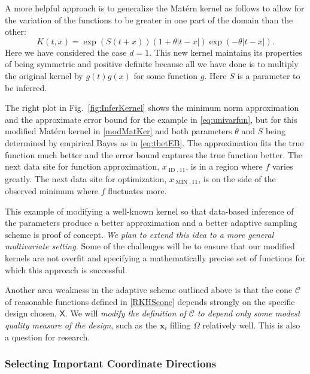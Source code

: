 \documentclass[11pt]{NSFamsart}
\DeclareMathOperator{\MIN}{MIN}
\DeclareMathOperator{\ID}{ID}
\newcommand{\mX}{\mathsf{X}}
\newcommand{\bx}{{\boldsymbol{x}}}
\newcommand{\calc}{{\mathcal{C}}}
\def\abs#1{\ensuremath{\left \lvert #1 \right \rvert}}
\begin{document}
A more helpful approach is to generalize the Mat\'ern kernel as follows to allow for the variation of the functions to be greater in one part of the domain than the other:
\begin{equation} \label{modMatKer}
    K(t,x) = \exp(S(t+x))(1 + \theta \abs{t-x}) \exp(-\theta\abs{t-x}).
\end{equation}
Here we have considered the case $d=1$.  This new kernel maintains its properties of being symmetric and positive definite because all we have done is to multiply the original kernel by $g(t)g(x)$ for some function $g$.  Here $S$ is a parameter to be inferred.

The right plot in Fig.\ \ref{fig:InferKernel} shows the minimum norm approximation and the approximate error bound for the example in \eqref{eq:univarfun}, but for this modified Mat\'ern kernel in \eqref{modMatKer} and both parameters $\theta$ and $S$ being determined by empirical Bayes as in \eqref{eq:thetEB}.  The approximation fits the true function much better and the error bound captures the true function better.  The next data site for function approximation, $x_{\ID,11}$, is in a region where $f$ varies greatly.  The next data site for optimization, $x_{\MIN,11}$,  is on the side of the observed minimum where $f$ fluctuates more.

This example of modifying a well-known kernel so that data-based inference of the parameters produce a better approximation and a better adaptive sampling scheme is proof of concept. \emph{ We plan to extend this idea to a more general multivariate setting.}  Some of the challenges will be to ensure that our modified kernels are not overfit and specifying a mathematically precise set of functions for which this approach is successful.

Another area weakness in the adaptive scheme outlined above is that the cone $\calc$ of reasonable functions defined in  \eqref{RKHScone} depends strongly on the specific design chosen, $\mX$.  We will \emph{modify the definition of $\calc$ to depend only some modest quality measure of the design}, such as the $\bx_i$ filling  $\Omega$ relatively well.  This is also a question for research.

\subsubsection{Selecting Important Coordinate Directions} \label{sec:selectCoord}
\end{document}
